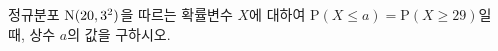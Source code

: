 정규분포 $\mathrm{N}(20{,}\mkern3mu\mathopen{}3^2)$을 따르는 확률변수 $X$에 대하여 $\mathrm{P}(X\le a)=\mathrm{P}(X\ge 29)$일 때, 상수 $a$의 값을 구하시오.
